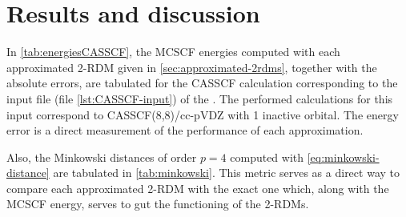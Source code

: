     \section{Results and discussion} %
    \label{sec:results}
    In \cref{tab:energiesCASSCF}, the MCSCF energies computed with each approximated
    2-RDM given in \cref{sec:approximated-2rdms}, together with the absolute
    errors, are tabulated for the CASSCF calculation corresponding to the input file
    (file \ref{lst:CASSCF-input}) of the .
    The performed calculations for this input correspond to CASSCF(8,8)/cc-pVDZ
    with 1 inactive orbital.
    The energy error is a direct measurement of the performance of each approximation.

    Also, the Minkowski distances of order $p=4$ computed with \cref{eq:minkowski-distance}
    are tabulated in \cref{tab:minkowski}.
    This metric serves as a direct way to compare each approximated 2-RDM with the
    exact one which, along with the MCSCF energy, serves to gut the functioning of
    the 2-RDMs.

